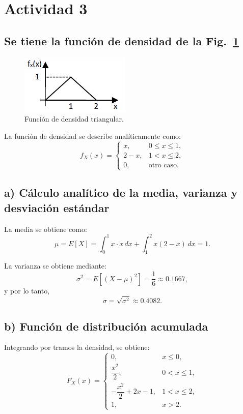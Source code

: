 \section{Actividad 3}

\subsection*{Se tiene la función de densidad de la Fig.~\ref{fig:diagrama_3}}

\begin{figure}[H]
    \centering
    \includegraphics[width=0.35\linewidth]{imagenes/Actividad_3/actividad_3.jpg}
    \caption{Función de densidad triangular.}
    \label{fig:diagrama_3}
\end{figure}

La función de densidad se describe analíticamente como:
\[
f_X(x)=
\begin{cases}
x, & 0 \leq x \leq 1, \\[6pt]
2-x, & 1 < x \leq 2, \\[6pt]
0, & \text{otro caso}.
\end{cases}
\]

\subsection*{a) Cálculo analítico de la media, varianza y desviación estándar}

La media se obtiene como:
\[
\mu = E[X] = \int_0^1 x \cdot x \,dx + \int_1^2 x (2-x)\,dx = 1.
\]

La varianza se obtiene mediante:
\[
\sigma^2 = E[(X-\mu)^2] = \frac{1}{6} \approx 0.1667,
\]
y por lo tanto,
\[
\sigma = \sqrt{\sigma^2} \approx 0.4082.
\]

\subsection*{b) Función de distribución acumulada}

Integrando por tramos la densidad, se obtiene:
\[
F_X(x)=
\begin{cases}
0, & x \leq 0, \\[6pt]
\dfrac{x^2}{2}, & 0 < x \leq 1, \\[10pt]
-\dfrac{x^2}{2}+2x-1, & 1 < x \leq 2, \\[6pt]
1, & x > 2.
\end{cases}
\]

